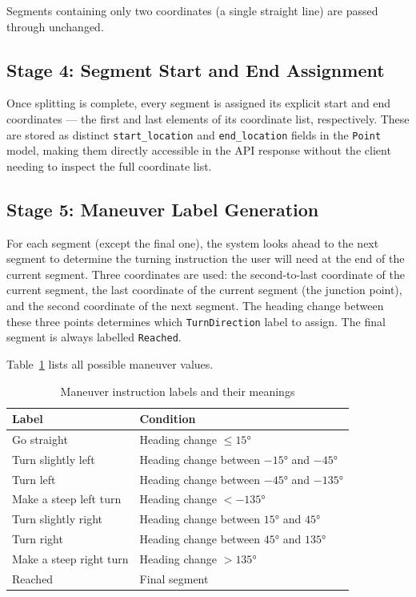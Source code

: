 \documentclass[12pt, a4paper]{report}
\begin{document}
Segments containing only two coordinates (a single straight line) are passed through unchanged.

\subsection{Stage 4: Segment Start and End Assignment}
\label{subsec:stage4}

Once splitting is complete, every segment is assigned its explicit start and end coordinates — the first and last elements of its coordinate list, respectively. These are stored as distinct \texttt{start\_location} and \texttt{end\_location} fields in the \texttt{Point} model, making them directly accessible in the API response without the client needing to inspect the full coordinate list.

\subsection{Stage 5: Maneuver Label Generation}
\label{subsec:stage5}

For each segment (except the final one), the system looks ahead to the next segment to determine the turning instruction the user will need at the end of the current segment. Three coordinates are used: the second-to-last coordinate of the current segment, the last coordinate of the current segment (the junction point), and the second coordinate of the next segment. The heading change between these three points determines which \texttt{TurnDirection} label to assign. The final segment is always labelled \texttt{Reached}.

Table~\ref{tab:maneuver} lists all possible maneuver values.

\begin{table}[H]
\centering
\caption{Maneuver instruction labels and their meanings}
\label{tab:maneuver}
\begin{tabular}{@{}ll@{}}
\toprule
\textbf{Label} & \textbf{Condition} \\
\midrule
Go straight & Heading change $\leq 15°$ \\
Turn slightly left & Heading change between $-15°$ and $-45°$ \\
Turn left & Heading change between $-45°$ and $-135°$ \\
Make a steep left turn & Heading change $< -135°$ \\
Turn slightly right & Heading change between $15°$ and $45°$ \\
Turn right & Heading change between $45°$ and $135°$ \\
Make a steep right turn & Heading change $> 135°$ \\
Reached & Final segment \\
\bottomrule
\end{tabular}
\end{table}
\end{document}
